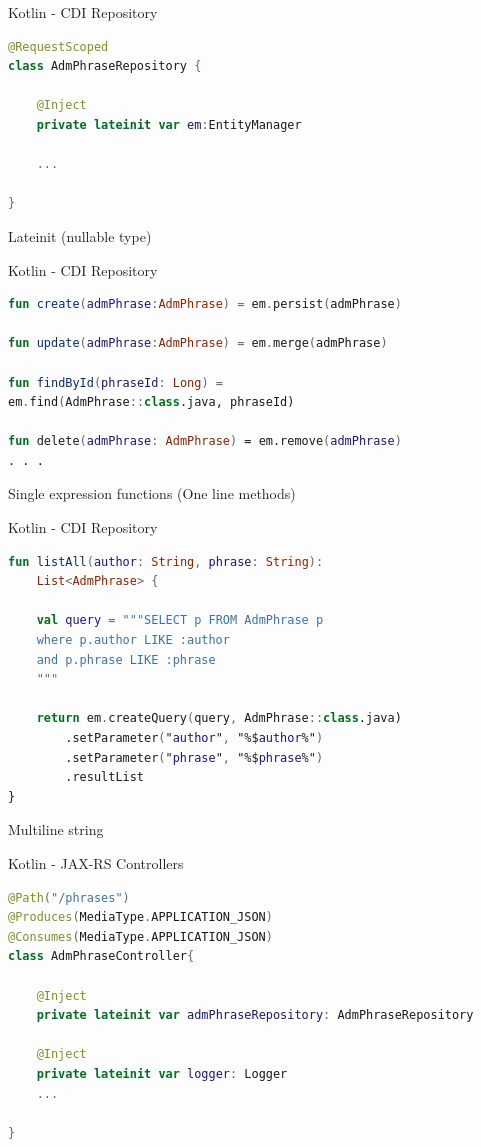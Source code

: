 \documentclass[aspectratio=169]{beamer}
\begin{document}
\begin{frame}[fragile]{Kotlin - CDI Repository}
\begin{lstlisting}[language=Kotlin]
@RequestScoped
class AdmPhraseRepository {

    @Inject
    private lateinit var em:EntityManager

    ...

}
\end{lstlisting}
Lateinit (nullable type)
\end{frame}

\begin{frame}[fragile]{Kotlin - CDI Repository}
\begin{lstlisting}[language=Kotlin]
fun create(admPhrase:AdmPhrase) = em.persist(admPhrase)

fun update(admPhrase:AdmPhrase) = em.merge(admPhrase)

fun findById(phraseId: Long) =
em.find(AdmPhrase::class.java, phraseId)

fun delete(admPhrase: AdmPhrase) = em.remove(admPhrase)
. . .
\end{lstlisting}
Single expression functions (One line methods)
\end{frame}

\begin{frame}[fragile]{Kotlin - CDI Repository}
\begin{lstlisting}[language=Kotlin]
fun listAll(author: String, phrase: String):
    List<AdmPhrase> {

    val query = """SELECT p FROM AdmPhrase p
    where p.author LIKE :author
    and p.phrase LIKE :phrase
    """

    return em.createQuery(query, AdmPhrase::class.java)
        .setParameter("author", "%$author%")
        .setParameter("phrase", "%$phrase%")
        .resultList
}
\end{lstlisting}
Multiline string
\end{frame}

\begin{frame}[fragile]{Kotlin - JAX-RS Controllers}
\begin{lstlisting}[language=Kotlin, basicstyle=\scriptsize\ttfamily]
@Path("/phrases")
@Produces(MediaType.APPLICATION_JSON)
@Consumes(MediaType.APPLICATION_JSON)
class AdmPhraseController{

    @Inject
    private lateinit var admPhraseRepository: AdmPhraseRepository

    @Inject
    private lateinit var logger: Logger
    ...

}
\end{lstlisting}
\end{frame}
\end{document}
